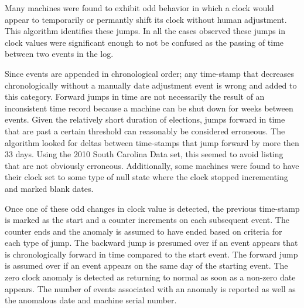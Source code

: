 Many machines were found to exhibit odd behavior in which a clock would appear to temporarily or permantly shift its clock without human adjustment. This algorithm identifies these jumps.  In all the cases observed these jumps in clock values were significant enough to not be confused as the passing of time between two events in the log. 

Since events are appended in chronological order; any time-stamp that decreases chronologically without a manually date adjustment event is wrong and added to this category. Forward jumps in time are not necessarily the result of an inconsistent time record because a machine can be shut down for weeks between events.  Given the relatively short duration of elections, jumps forward in time that are past a certain threshold can reasonably be considered erroneous. The algorithm looked for deltas between time-stamps that jump forward by more then 33 days.  Using the 2010 South Carolina Data set, this seemed to avoid listing that are not obviously erroneous. Additionally, some machines were found to have their clock set to some type of null state where the clock stopped incrementing and marked blank dates. 

Once one of these odd changes in clock value is detected, the previous time-stamp is marked as the start and a counter increments on each subsequent event.  The counter ends and the anomaly is assumed to have ended based on criteria for each type of jump. The backward jump is presumed over if an event appears that is chronologically forward in time compared to the start event.  The forward jump is assumed over if an event appears on the same day of the starting event.  The zero clock anomaly is detected as returning to normal as soon as a non-zero date appears. The number of events associated with an anomaly is reported as well as the anomalous date and machine serial number. 

